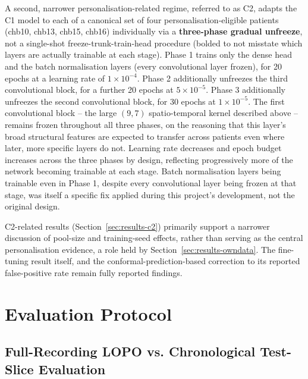 A second, narrower personalisation-related regime, referred to as C2, adapts the C1 model to each of a canonical set of four personalisation-eligible patients 
(chb10, chb13, chb15, chb16) individually via a \textbf{three-phase gradual unfreeze}, not a single-shot freeze-trunk-train-head procedure 
(bolded to not misstate which layers are actually trainable at each stage). Phase 1 trains only the dense head and the batch normalisation layers 
(every convolutional layer frozen), for 20 epochs at a learning rate of $1\times10^{-4}$. Phase 2 additionally unfreezes the third convolutional block, for a further 20 epochs 
at $5\times10^{-5}$. Phase 3 additionally unfreezes the second convolutional block, for 30 epochs at $1\times10^{-5}$. The first convolutional block -- the large $(9,7)$ 
spatio-temporal kernel described above -- remains frozen throughout all three phases, on the reasoning that this layer's broad structural features are expected to transfer across 
patients even where later, more specific layers do not. Learning rate decreases and epoch budget increases across the three phases by design, reflecting progressively more of the 
network becoming trainable at each stage. Batch normalisation layers being trainable even in Phase 1, despite every convolutional layer being frozen at that stage, was itself a 
specific fix applied during this project's development, not the original design.

C2-related results (Section~\ref{sec:results-c2}) primarily support a narrower discussion of pool-size and training-seed effects, rather than serving as the 
central personalisation evidence, a role held by Section~\ref{sec:results-owndata}. The fine-tuning result itself, and the conformal-prediction-based correction to 
its reported false-positive rate remain fully reported findings.

\section{Evaluation Protocol}
\label{sec:eval-protocol}

\subsection{Full-Recording LOPO vs. Chronological Test-Slice Evaluation}

